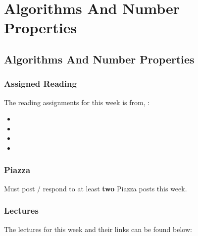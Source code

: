 \clearpage

\renewcommand{\ChapTitle}{Algorithms And Number Properties}
\renewcommand{\SectionTitle}{Algorithms And Number Properties}

\chapter{\ChapTitle}
\section{\SectionTitle}

\subsection{Assigned Reading}

The reading assignments for this week is from, \Textbook:

\begin{itemize}
    \item {}
    \item {}
    \item {}
    \item {}
\end{itemize}

\subsection{Piazza}

Must post / respond to at least \textbf{two} Piazza posts this week.

\subsection{Lectures}

The lectures for this week and their links can be found below:

